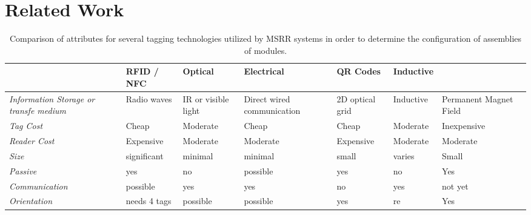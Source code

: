 
\section{Related Work}
\label{sec:RelatedWork}

\begin{table*}[t]
	\centering
	\caption{Comparison of attributes for several tagging technologies utilized by MSRR systems in order to determine the configuration of assemblies of modules.}
	\newcommand{\wdd}{2.0cm}
	\begin{tabular}{ p{2.4 cm} p{\wdd}  p{\wdd} p{\wdd} p{\wdd} p{\wdd} p{\wdd} p{\wdd}  }
		\hline
		\addlinespace[1ex]
													& RFID / NFC		& Optical				& Electrical 		& QR Codes 			& Inductive				& \bf{\tagNamePlural} 		\\ %
		\hline
		
		\addlinespace[0.5ex]	\textit{Information Storage or transfe medium}	& Radio waves		& IR or visible light	& Direct wired communication	& 2D optical grid	& Inductive				& Permanent Magnet Field	\\
		
		\addlinespace[0.5ex]	\textit{Tag Cost}		& Cheap				& Moderate				& Cheap				& Cheap	 			& Moderate				& Inexpensive 				\\
		
		\addlinespace[0.5ex]	\textit{Reader Cost}	& Expensive			& Moderate				& Moderate			& Expensive 	 	& Moderate				& Moderate 					\\
		
		\addlinespace[0.5ex] 	\textit{Size} 			& significant 		& minimal 				& minimal	  		& small      		& varies				& Small		  				\\
		
		\addlinespace[0.5ex]	\textit{Passive} 		& yes				& no					& possible	 		& yes				& no					& Yes		  				\\
		
		\addlinespace[0.5ex]	\textit{Communication} 	& possible			& yes					& yes	 			& no				& yes					& not yet		  			\\
		
		\addlinespace[0.5ex] 	\textit{Orientation} 	& needs 4 tags 		& possible 				& possible	 		& yes				& re					& Yes						\\
		

\end{tabular}
\end{table*}
